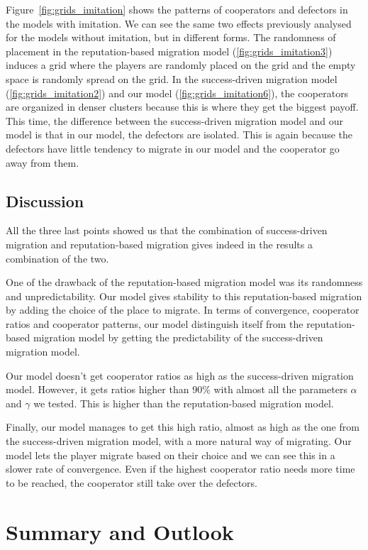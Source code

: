 \documentclass[11pt]{article}
\begin{document}
Figure~\ref{fig:grids_imitation} shows the patterns of cooperators and defectors in the models with imitation. We can see the same two effects previously analysed for the models without imitation, but in different forms.
The randomness of placement in the reputation-based migration model (\ref{fig:grids_imitation3}) induces a grid where the players are randomly placed on the grid and the empty space is randomly spread on the grid. In the success-driven migration model (\ref{fig:grids_imitation2}) and our model (\ref{fig:grids_imitation6}), the cooperators are organized in denser clusters because this is where they get the biggest payoff.
This time, the difference between the success-driven migration model and our model is that in our model, the defectors are isolated. This is again because the defectors have little tendency to migrate in our model and the cooperator go away from them.

\subsection{Discussion}

All the three last points showed us that the combination of success-driven migration and reputation-based migration gives indeed in the results a combination of the two.

One of the drawback of the reputation-based migration model was its randomness and unpredictability. Our model gives stability to this reputation-based migration by adding the choice of the place to migrate. In terms of convergence, cooperator ratios and cooperator patterns, our model distinguish itself from the reputation-based migration model by getting the predictability of the success-driven migration model.

Our model doesn't get cooperator ratios as high as the success-driven migration model. However, it gets ratios higher than 90\% with almost all the parameters $\alpha$ and $\gamma$ we tested. This is higher than the reputation-based migration model.

Finally, our model manages to get this high ratio, almost as high as the one from the success-driven migration model, with a more natural way of migrating. Our model lets the player migrate based on their choice and we can see this in a slower rate of convergence. Even if the highest cooperator ratio needs more time to be reached, the cooperator still take over the defectors.


\section{Summary and Outlook}
\end{document}
